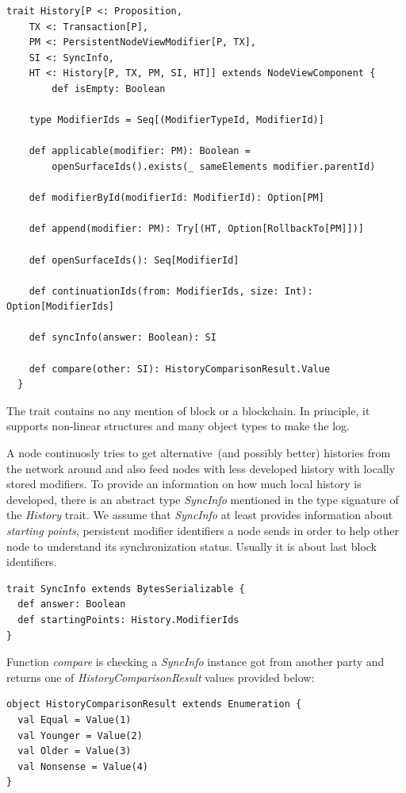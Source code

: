 \documentclass[]{report}   %
\begin{document}
\begin{lstlisting}
trait History[P <: Proposition,
	TX <: Transaction[P],
	PM <: PersistentNodeViewModifier[P, TX],
	SI <: SyncInfo,
	HT <: History[P, TX, PM, SI, HT]] extends NodeViewComponent {
		def isEmpty: Boolean	

	type ModifierIds = Seq[(ModifierTypeId, ModifierId)]	

  	def applicable(modifier: PM): Boolean = 
  		openSurfaceIds().exists(_ sameElements modifier.parentId)

  	def modifierById(modifierId: ModifierId): Option[PM]	

  	def append(modifier: PM): Try[(HT, Option[RollbackTo[PM]])]

  	def openSurfaceIds(): Seq[ModifierId]

  	def continuationIds(from: ModifierIds, size: Int): Option[ModifierIds]

  	def syncInfo(answer: Boolean): SI

  	def compare(other: SI): HistoryComparisonResult.Value	
  }
\end{lstlisting}

The trait contains no any mention of block or a blockchain. In principle, it supports non-linear structures and many object types to make the log. 

A node continuosly tries to get alternative~(and possibly better) histories from the network around and also feed nodes with less developed history with locally stored modifiers. To provide an information on how much local history is developed, there is an abstract type \textit{SyncInfo} mentioned in the type signature of the \textit{History} trait. We assume that \textit{SyncInfo} at least provides information about \textit{starting points}, persistent modifier identifiers a node sends in order to help other node to understand its synchronization status. Usually it is about last block identifiers. 

\begin{lstlisting}
trait SyncInfo extends BytesSerializable {
  def answer: Boolean
  def startingPoints: History.ModifierIds
}
\end{lstlisting}

Function \textit{compare} is checking a \textit{SyncInfo} instance got from another party and returns one of \textit{HistoryComparisonResult} values provided below: 

\begin{lstlisting}
object HistoryComparisonResult extends Enumeration {
  val Equal = Value(1)
  val Younger = Value(2)
  val Older = Value(3)
  val Nonsense = Value(4)
}
\end{lstlisting}
\end{document}
